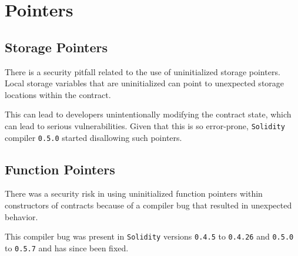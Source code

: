 \section{Pointers}\label{pointers}

\subsection{Storage Pointers}\label{storage-pointers}

There is a security pitfall related to the use of uninitialized storage
pointers. Local storage variables that are uninitialized can point to
unexpected storage locations within the contract.

This can lead to developers unintentionally modifying the contract
state, which can lead to serious vulnerabilities. Given that this is so
error-prone, \texttt{Solidity} compiler \texttt{0.5.0} started
disallowing such pointers.

\subsection{Function Pointers}\label{function-pointers}

There was a security risk in using uninitialized function pointers
within constructors of contracts because of a compiler bug that resulted
in unexpected behavior.

This compiler bug was present in \texttt{Solidity} versions
\texttt{0.4.5} to \texttt{0.4.26} and \texttt{0.5.0} to \texttt{0.5.7}
and has since been fixed.
